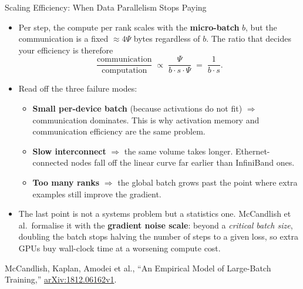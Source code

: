 \begin{frame}[allowframebreaks]{Scaling Efficiency: When Data Parallelism Stops Paying}
  \begin{itemize}\itemsep0.4em
    \item[\textcolor{red}{$\blacktriangleright$}] Per step, the compute per rank scales with the \textbf{micro-batch} $b$, but the communication is a fixed $\approx 4\Psi$ bytes regardless of $b$. The ratio that decides your efficiency is therefore
      \[
        \frac{\text{communication}}{\text{computation}} \;\propto\; \frac{\Psi}{b \cdot s \cdot \Psi} \;=\; \frac{1}{b \cdot s}.
      \]
    \item[\textcolor{red}{$\blacktriangleright$}] Read off the three failure modes:
      \begin{itemize}\itemsep0.15em\footnotesize
        \item \textbf{Small per-device batch} (because activations do not fit) $\Rightarrow$ communication dominates. This is why activation memory and communication efficiency are the same problem.
        \item \textbf{Slow interconnect} $\Rightarrow$ the same volume takes longer. Ethernet-connected nodes fall off the linear curve far earlier than InfiniBand ones.
        \item \textbf{Too many ranks} $\Rightarrow$ the global batch grows past the point where extra examples still improve the gradient.
      \end{itemize}
    \item[\textcolor{red}{$\blacktriangleright$}] The last point is not a systems problem but a statistics one. McCandlish et al.\ formalise it with the \textbf{gradient noise scale}: beyond a \emph{critical batch size}, doubling the batch stops halving the number of steps to a given loss, so extra GPUs buy wall-clock time at a worsening compute cost.
  \end{itemize}
  \vspace{0.1em}
  {\scriptsize McCandlish, Kaplan, Amodei et al., ``An Empirical Model of Large-Batch Training,'' \href{https://arxiv.org/abs/1812.06162v1}{arXiv:1812.06162v1}.}
\end{frame}

